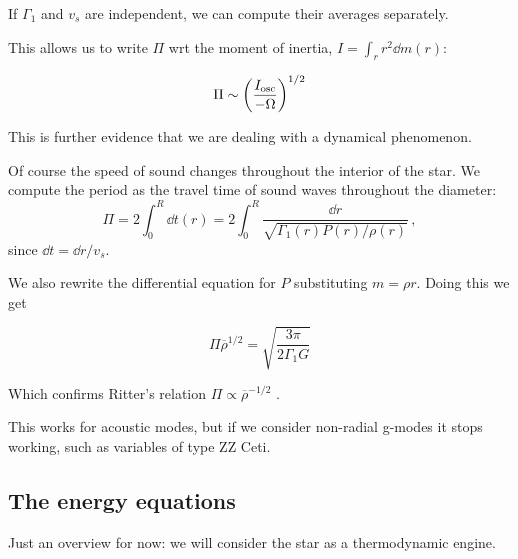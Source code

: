 \documentclass[main.tex]{subfiles}
\begin{document}
If \(\Gamma_1 \) and \(v_s\) are independent, we can compute their averages separately.

This allows us to write \(\Pi  \) wrt the moment of inertia, \(I = \int_r r^2 \dd{m}(r)\):

\begin{equation}
  \Pi \sim \qty(\frac{I_{\text{osc}}}{-\Omega} )^{1/2}
\end{equation}

This is further evidence that we are dealing with a dynamical phenomenon.

Of course the speed of sound changes throughout the interior of the star.
We compute the period as the travel time of sound waves throughout the diameter:
%
\begin{equation}
  \Pi = 2 \int _{0}   ^{R} \dd{t(r)} = 2 \int_0^R \frac{\dd{r} }{\sqrt{\Gamma_1(r) P(r) / \rho(r)}}\,,
\end{equation}
%
since \(\dd{t} = \dd{r} / v_s\).

We also rewrite the differential equation for \(P\) substituting \(m=\rho r\). Doing this we get

\begin{equation}
  \Pi  \overline{\rho}^{1/2}= \sqrt{\frac{3 \pi}{2 \Gamma_1 G}}
\end{equation}

Which confirms Ritter's relation \(\Pi \propto \overline{\rho}^{-1/2} \) .

This works for acoustic modes, but if we consider non-radial g-modes it stops working, such as variables of type ZZ Ceti.

\subsection{The energy equations}

Just an overview for now: we will consider the star as a thermodynamic engine.
\end{document}
